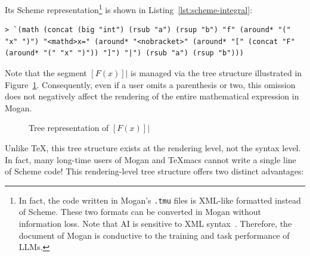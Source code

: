 Its Scheme representation\footnote{In fact, the code written in Mogan's \texttt{.tmu} files is XML-like formatted instead of Scheme. These two formats can be converted in Mogan without information loss. Note that AI is sensitive to XML syntax~\cite{sui2024Table}. Therefore, the document of Mogan is conductive to the training and task performance of LLMs.} is shown in Listing~\ref{lst:scheme-integral}:
\begin{lstlisting}[caption={Scheme representation of integral expression},label={lst:scheme-integral},upquote=true]
> `(math (concat (big "int") (rsub "a") (rsup "b") "f" (around* "(" "x" ")") "<mathd>x=" (around* "<nobracket>" (around* "[" (concat "F" (around* "(" "x" ")")) "]") "|") (rsub "a") (rsup "b")))
\end{lstlisting}

Note that the segment $\left[ F(x) \right] |$ is managed via the tree structure illustrated in Figure~\ref{fig:tree-representation}. Consequently, even if a user omits a parenthesis or two, this omission does not negatively affect the rendering of the entire mathematical expression in Mogan.

\begin{figure}[htbp]
    \centering
    \caption{Tree representation of $ [F (x)] |$}
    \label{fig:tree-representation}
\end{figure}

Unlike \TeX{}, this tree structure exists at the rendering level, not the syntax level. In fact, many long-time users of Mogan and TeXmacs cannot write a single line of Scheme code! This rendering-level tree structure offers two distinct advantages:

